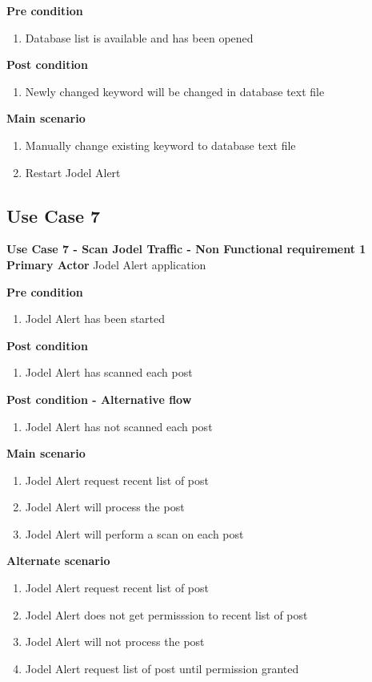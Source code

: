 \documentclass[a4paper,12pt]{article}
\begin{document}
\textbf{Pre condition}
\begin{enumerate}
	\item Database list is available and has been opened
\end{enumerate}
\textbf{Post condition}
\begin{enumerate}
	\item Newly changed keyword will be changed in database text file
\end{enumerate}
\textbf{Main scenario}
\begin{enumerate}
	\item Manually change existing keyword to database text file
	\item Restart Jodel Alert
\end{enumerate}

\subsection{Use Case 7}
\textbf{Use Case 7 - Scan Jodel Traffic - Non Functional requirement 1}
\textbf{Primary Actor}
Jodel Alert application

\textbf{Pre condition}
\begin{enumerate}
	\item Jodel Alert has been started
\end{enumerate}
\textbf{Post condition}
\begin{enumerate}
	\item Jodel Alert has scanned each post
\end{enumerate}
\textbf{Post condition - Alternative flow}
\begin{enumerate}
	\item Jodel Alert has not scanned each post
\end{enumerate}
\textbf{Main scenario}
\begin{enumerate}
	\item Jodel Alert request recent list of post
	\item Jodel Alert will process the post
	\item Jodel Alert will perform a scan on each post
\end{enumerate}
\textbf{Alternate scenario}
\begin{enumerate}
	\item Jodel Alert request recent list of post
	\item Jodel Alert does not get permisssion to recent list of post
	\item Jodel Alert will not process the post
	\item Jodel Alert request list of post until permission granted
\end{enumerate}
\end{document}
